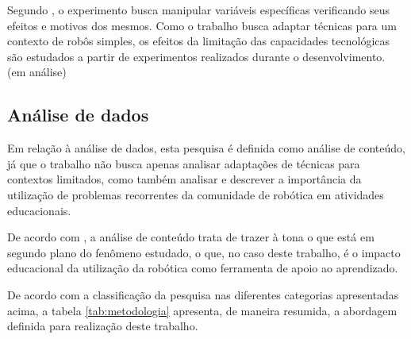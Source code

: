 		Segundo \cite{metodologiaCientifica}, o experimento busca manipular variáveis específicas verificando seus efeitos e motivos dos mesmos. Como o trabalho busca adaptar técnicas para um contexto de robôs simples, os efeitos da limitação das capacidades tecnológicas são estudados a partir de experimentos realizados durante o desenvolvimento. (em análise)

	\subsection{Análise de dados} %
	\label{sec:classificação_quanto_à_técnica_de_análise_de_dados}
	
		Em relação à análise de dados, esta pesquisa é definida como análise de conteúdo, já que o trabalho não busca apenas analisar adaptações de técnicas para contextos limitados, como também  analisar e descrever a importância da utilização de problemas recorrentes da comunidade de robótica em atividades educacionais. 

		De acordo com \cite{metodologiaCientifica}, a análise de conteúdo trata de trazer à tona o que está em segundo plano do fenômeno estudado, o que, no caso deste trabalho, é o impacto educacional da utilização da robótica como ferramenta de apoio ao aprendizado.

	De acordo com a classificação da pesquisa nas diferentes categorias apresentadas acima, a tabela \ref{tab:metodologia} apresenta, de maneira resumida, a abordagem definida para realização deste trabalho.

